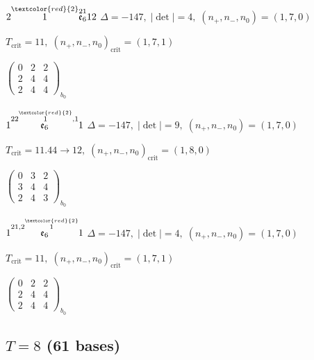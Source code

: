 \documentclass[10pt]{article}
\begin{document}
\smallskip

$2\overset{\textcolor{red}{2}}{1}\overset{21}{\mathfrak{e}_6}12$ \quad $\Delta=-147,\; |\det|=4,\; (n_+,n_-,n_0)=(1,7,0)$

\hspace{1em}$T_{\text{crit}}=11,\; (n_+,n_-,n_0)_{\text{crit}}=(1,7,1)$

\hspace{2em}$\left(\begin{smallmatrix}0 & 2 & 2 \\ 2 & 4 & 4 \\ 2 & 4 & 4\end{smallmatrix}\right)_{\!b_0}$

\smallskip

$1\overset{22\overset{\textcolor{red}{2}}{1},1}{\mathfrak{e}_6}1$ \quad $\Delta=-147,\; |\det|=9,\; (n_+,n_-,n_0)=(1,7,0)$

\hspace{1em}$T_{\text{crit}}=11.44 \to 12,\; (n_+,n_-,n_0)_{\text{crit}}=(1,8,0)$

\hspace{2em}$\left(\begin{smallmatrix}0 & 3 & 2 \\ 3 & 4 & 4 \\ 2 & 4 & 3\end{smallmatrix}\right)_{\!b_0}$

\smallskip

$1\overset{21,2\overset{\textcolor{red}{2}}{1}}{\mathfrak{e}_6}1$ \quad $\Delta=-147,\; |\det|=4,\; (n_+,n_-,n_0)=(1,7,0)$

\hspace{1em}$T_{\text{crit}}=11,\; (n_+,n_-,n_0)_{\text{crit}}=(1,7,1)$

\hspace{2em}$\left(\begin{smallmatrix}0 & 2 & 2 \\ 2 & 4 & 4 \\ 2 & 4 & 4\end{smallmatrix}\right)_{\!b_0}$


\subsection*{$T = 8$ \quad (61 bases)}
\smallskip
\end{document}
